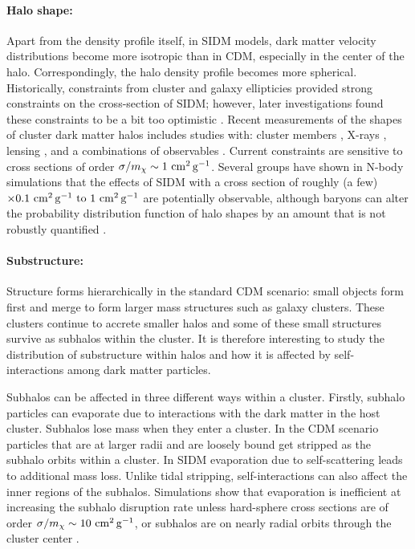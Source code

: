 \paragraph{Halo shape:} Apart from the density profile itself, in SIDM models, dark matter velocity distributions become more isotropic than in CDM, especially in the center of the halo.  Correspondingly,  the halo density profile becomes more spherical.  Historically, constraints from cluster and galaxy ellipticies \citep{Miralde-Escuda:2000} provided strong constraints on the cross-section of SIDM; however, later investigations found these constraints to be a bit too optimistic \citep{Peter:2013}. 
Recent measurements of the shapes of cluster dark matter halos includes studies with: cluster members \citep{2018MNRAS.475.2421S},  X-rays \citep{Hashimoto:2007},  lensing \citep{Mandelbaum:2006, Evans:2009, Oguri:2010}, and a combinations of observables \citep{Clampitt:2016, Sereno:2018}.  
Current constraints are sensitive to cross sections of order $\sigma/m_\chi \sim 1 \mathrm{\,\mathrm{\,cm}^2\mathrm{\,g}^{-1}}$.
Several groups have shown in N-body simulations that the effects of SIDM with a cross section of roughly (a few)$\times 0.1 \mathrm{\,\mathrm{\,cm}^2\mathrm{\,g}^{-1}} \hbox{ to } 1 \mathrm{\,\mathrm{\,cm}^2\mathrm{\,g}^{-1}}$ are potentially observable, although baryons can alter the probability distribution function of halo shapes by an amount that is not robustly quantified \citep[\eg][]{Peter:2013, Robertson:2017mgj, Brinckmann:2018}.


\paragraph{Substructure:} Structure forms hierarchically in the standard CDM scenario: small objects form first and merge to form larger mass structures such as galaxy clusters. These clusters continue to accrete smaller halos and some of these small structures survive as subhalos within the cluster. It is therefore interesting to study the distribution of substructure within halos and how it is affected by self-interactions among dark matter particles. 

Subhalos can be affected in three different ways within a cluster. Firstly, subhalo particles can evaporate due to interactions with the dark matter in the host cluster. Subhalos lose mass when they enter a cluster. In the CDM scenario particles that are at larger radii and are loosely bound get stripped as the subhalo orbits within a cluster. In SIDM evaporation due to self-scattering leads to additional mass loss. Unlike tidal stripping, self-interactions can also affect the inner regions of the subhalos. Simulations show that evaporation is inefficient at increasing the subhalo disruption rate unless hard-sphere cross sections are of order $\sigma/m_\chi \sim 10\mathrm{\,\mathrm{\,cm}^2\mathrm{\,g}^{-1}}$, or subhalos are on nearly radial orbits through the cluster center \citep{2012MNRAS.423.3740V,Rocha:2012jg,Dooley:2016ajo}. 

